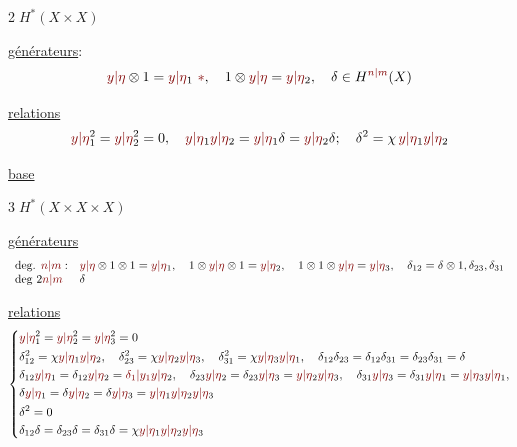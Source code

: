 \textcircled{2}\quad\uline{$H^*(X\times X)$}

\uline{générateurs}:
\[
\unsure{y|\eta}\otimes1=\unsure{y|\eta}_1\ \deleted{\unsure{*}},\quad
1\otimes\unsure{y|\eta}=\unsure{y|\eta}_2,\quad
\delta\in H^{\unsure{n|m}}(X)
\]

\uline{relations}
\[
\unsure{y|\eta}_1^2=\unsure{y|\eta}_2^2=0,\quad
\unsure{y|\eta}_1\unsure{y|\eta}_2=\unsure{y|\eta}_1\delta=\unsure{y|\eta}_2\delta;\quad
\delta^2=\chi\,\unsure{y|\eta}_1\unsure{y|\eta}_2
\]

\uline{base}

\textcircled{3}\quad $H^*(X\times X\times X)$

\uline{générateurs}
\[
\begin{array}{ll}
\text{deg. }\unsure{n|m}:&
\unsure{y|\eta}\otimes1\otimes1=\unsure{y|\eta}_1,\quad
1\otimes\unsure{y|\eta}\otimes1=\unsure{y|\eta}_2,\quad
1\otimes1\otimes\unsure{y|\eta}=\unsure{y|\eta}_3,\quad
\delta_{12}=\delta\otimes1,\delta_{23},\delta_{31}\\
\text{deg }2\unsure{n|m}&\delta
\end{array}
\]

\uline{relations}
\[
\left\{
\begin{aligned}
&\unsure{y|\eta}_1^2=\unsure{y|\eta}_2^2=\unsure{y|\eta}_3^2=0\\
&\delta_{12}^2=\chi\unsure{y|\eta}_1\unsure{y|\eta}_2,\quad
\delta_{23}^2=\chi\unsure{y|\eta}_2\unsure{y|\eta}_3,\quad
\delta_{31}^2=\chi\unsure{y|\eta}_3\unsure{y|\eta}_1,\quad
\delta_{12}\delta_{23}=\delta_{12}\delta_{31}=\delta_{23}\delta_{31}=\delta\\
&\delta_{12}\unsure{y|\eta}_1=\delta_{12}\unsure{y|\eta}_2=\unsure{\delta_1|y_1}\unsure{y|\eta}_2,\quad
\delta_{23}\unsure{y|\eta}_2=\delta_{23}\unsure{y|\eta}_3=\unsure{y|\eta}_2\unsure{y|\eta}_3,\quad
\delta_{31}\unsure{y|\eta}_3=\delta_{31}\unsure{y|\eta}_1=\unsure{y|\eta}_3\unsure{y|\eta}_1,\\
&\delta\unsure{y|\eta}_1=\delta\unsure{y|\eta}_2=\delta\unsure{y|\eta}_3=\unsure{y|\eta}_1\unsure{y|\eta}_2\unsure{y|\eta}_3\\
&\delta^2=0\\
&\delta_{12}\delta=\delta_{23}\delta=\delta_{31}\delta=\chi\unsure{y|\eta}_1\unsure{y|\eta}_2\unsure{y|\eta}_3
\end{aligned}
\right.
\]

